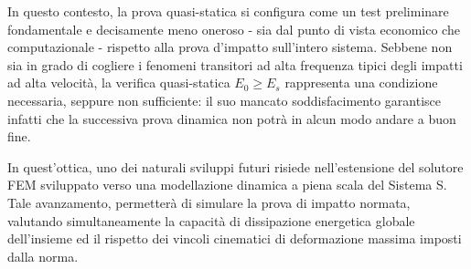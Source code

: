 In questo contesto, la prova quasi-statica si configura come un test preliminare fondamentale e decisamente meno oneroso - sia dal punto di vista economico che computazionale - rispetto alla prova d'impatto sull'intero sistema. Sebbene non sia in grado di cogliere i fenomeni transitori ad alta frequenza tipici degli impatti ad alta velocità, la verifica quasi-statica $E_0 \ge E_s$ rappresenta una condizione necessaria, seppure non sufficiente: il suo mancato soddisfacimento garantisce infatti che la successiva prova dinamica non potrà in alcun modo andare a buon fine.

In quest'ottica, uno dei naturali sviluppi futuri risiede nell'estensione del solutore FEM sviluppato verso una modellazione dinamica a piena scala del Sistema S. Tale avanzamento, permetterà di simulare la prova di impatto normata, valutando simultaneamente la capacità di dissipazione energetica globale dell'insieme ed il rispetto dei vincoli cinematici di deformazione massima imposti dalla norma. 






